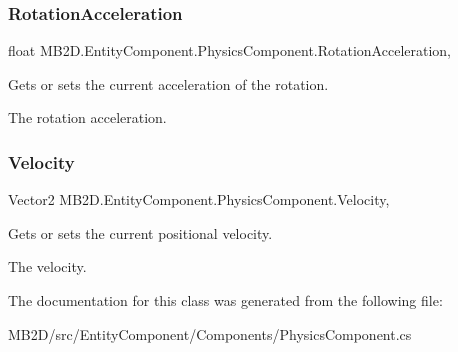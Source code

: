 \subsubsection{\texorpdfstring{Rotation\+Acceleration}{RotationAcceleration}}
{\footnotesize\ttfamily float M\+B2\+D.\+Entity\+Component.\+Physics\+Component.\+Rotation\+Acceleration\hspace{0.3cm}{\ttfamily [get]}, {\ttfamily [set]}}



Gets or sets the current acceleration of the rotation. 

The rotation acceleration.\hypertarget{class_m_b2_d_1_1_entity_component_1_1_physics_component_a67477d82a7e9555cb9d08351c8ffe24f}{}\label{class_m_b2_d_1_1_entity_component_1_1_physics_component_a67477d82a7e9555cb9d08351c8ffe24f} 
\subsubsection{\texorpdfstring{Velocity}{Velocity}}
{\footnotesize\ttfamily Vector2 M\+B2\+D.\+Entity\+Component.\+Physics\+Component.\+Velocity\hspace{0.3cm}{\ttfamily [get]}, {\ttfamily [set]}}



Gets or sets the current positional velocity. 

The velocity.

The documentation for this class was generated from the following file\+:\begin{DoxyCompactItemize}
\item 
M\+B2\+D/src/\+Entity\+Component/\+Components/Physics\+Component.\+cs\end{DoxyCompactItemize}

